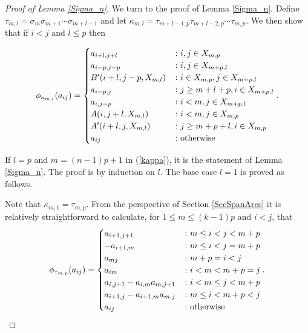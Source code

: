 \documentclass[11pt]{amsart}
\def\s{{\sigma}}
\def\t{{\tau}}
\theoremstyle{definition}
\begin{document}
\begin{proof} [Proof of Lemma \ref{Sigma_n}]
We turn to the proof of Lemma \ref{Sigma_n}. Define $\t_{m,l} = \s_m\s_{m+1}\cdots\s_{m+l-1}$ and let $\kappa_{m,l} = \t_{m+l-1,p}\t_{m+l-2,p}\cdots\t_{m,p}$.  We then show that if $i<j$ and $l\le p$ then

\begin{equation}\label{kappa}
\phi_{\kappa_{m,l}}(a_{ij}) =
  \begin{cases}
       a_{i+l,j+l} &\colon i,j\in X_{m,p}\\
       a_{i-p,j-p} & \colon i,j\in X_{m+p,l}\\
       B'(i+l,j-p,X_{m,l}) & \colon i\in X_{m,p}, j\in X_{m+p,l}\\
       a_{i-p,j} &\colon j\ge m+l+p, i\in X_{m+p,l}\\
       a_{i,j-p} & \colon i<m, j\in X_{m+p,l}\\
       A(i,j+l,X_{m,l}) & \colon i<m, j\in X_{m,p}\\
       A'(i+l,j,X_{m,l}) & \colon j\ge m+p+l, i\in X_{m,p}\\
       a_{ij} & \colon \textnormal{otherwise}
  \end{cases}.
\end{equation}

If $l=p$ and $m=(n-1)p+1$ in (\ref{kappa}), it is the statement of Lemma \ref{Sigma_n}. The proof is by induction on $l$. The base case $l=1$ is proved as follows.

Note that $\kappa_{m,1}=\t_{m,p}$. From the perspective of Section \ref{SecSpanArcs} it is relatively straightforward to calculate, for $1\le m \le (k-1)p$ and $i<j$, that
\begin{equation}\label{tau}
\phi_{\t_{m,p}}(a_{ij}) =
  \begin{cases}
       a_{i+1,j+1} & \colon m\le i<j< m+p\\
       -a_{i+1,m} & \colon m\le i < j = m+p\\
       a_{mj} & \colon m+p=i<j\\
       a_{im} & \colon i<m<m+p=j\\
       a_{i,j+1}-a_{i,m}a_{m,j+1} & \colon i<m\le j< m+p\\
       a_{i+1,j}-a_{i+1,m}a_{m,j} & \colon m\le i< m+p<j\\
       a_{ij} & \colon \textnormal{otherwise}
  \end{cases}.
\end{equation}


\end{proof}
\end{document}
